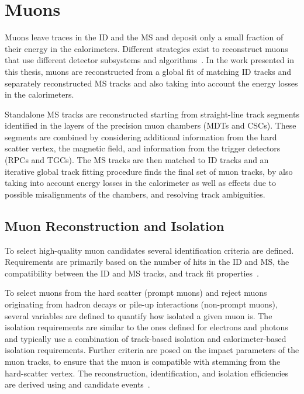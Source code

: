 
\section{Muons}
\label{sec:muon-reconstruction}
Muons leave traces in the ID and the MS and deposit only a small fraction of their energy in the calorimeters.
Different strategies exist to reconstruct muons that use different detector subsystems and algorithms~\cite{MUON-2018-03}.
In the work presented in this thesis, muons are reconstructed from a global fit of matching ID tracks and separately reconstructed MS tracks and also taking into account the energy losses in the calorimeters.

Standalone MS tracks are reconstructed starting from straight-line track segments identified in the layers of the precision muon chambers (MDTs and CSCs).
These segments are combined by considering additional information from the hard scatter vertex, the magnetic field, and information from the trigger detectors (RPCs and TGCs). The MS tracks are then matched to ID tracks and an iterative global track fitting procedure finds the final set of muon tracks, by also taking into account energy losses in the calorimeter as well as effects due to possible misalignments of the chambers, and resolving track ambiguities.

\subsection{Muon Reconstruction and Isolation}
To select high-quality muon candidates several identification criteria are defined.
Requirements are primarily based on the number of hits in the ID and MS, the compatibility between the ID and MS tracks, and track fit properties~\cite{MUON-2018-03}.

To select muons from the hard scatter (prompt muons) and reject muons originating from hadron decays or pile-up interactions (non-prompt muons), several variables are defined to quantify how isolated a given muon is.
The isolation requirements are similar to the ones defined for electrons and photons and typically use a combination of track-based isolation and calorimeter-based isolation requirements.
Further criteria are posed on the impact parameters of the muon tracks, to ensure that the muon is compatible with stemming from the hard-scatter vertex.
The reconstruction, identification, and isolation efficiencies are derived using \Jpsimumu and \Zmumu candidate events~\cite{MUON-2018-03}.

